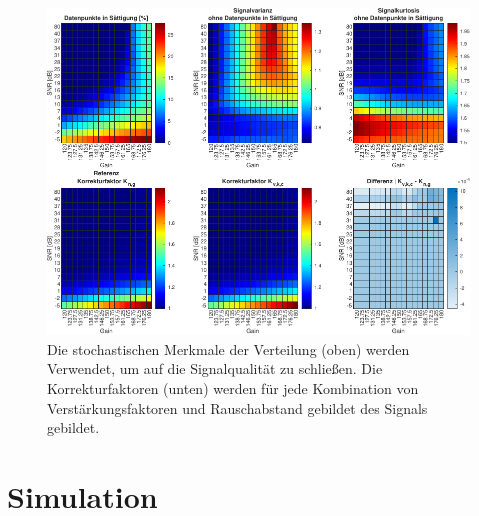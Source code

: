 \begin{figure}[th!]
	\centering
	\includegraphics[width=.9\textwidth]{../img/lut.pdf}
	\caption{Die stochastischen Merkmale der Verteilung (oben) werden Verwendet, um auf die Signalqualität zu schließen. Die Korrekturfaktoren (unten) werden für jede Kombination von Verstärkungsfaktoren und Rauschabstand gebildet des Signals gebildet.}
	\label{fig:lut} 
\end{figure}


\section{Simulation}

